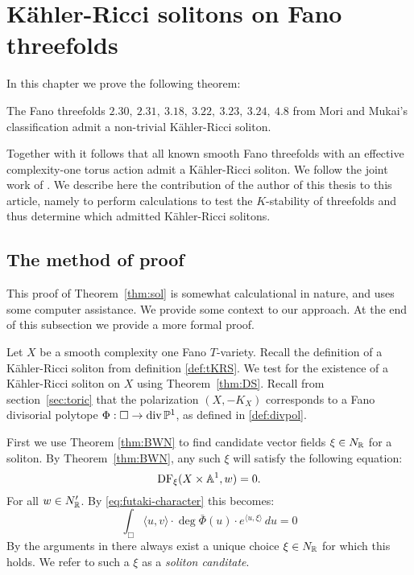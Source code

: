 \chapter{K\"ahler-Ricci solitons on Fano threefolds} \label{chap:sol}



In this chapter we prove the following theorem:
\begin{theorem} \label{thm:sol}
The Fano threefolds \(2.30, \ 2.31, \ 3.18, \ 3.22, \ 3.23, \ 3.24, \ 4.8\) from Mori and Mukai's classification \cite{mori1981classification} admit a non-trivial K\"ahler-Ricci soliton.
\end{theorem}
Together with \cite[Theorems. 6.1, 6.2]{ilten2015} it follows that all known smooth Fano threefolds with an effective complexity-one torus action admit a K\"ahler-Ricci soliton. We follow the joint work of \cite{cable2018classification}. We describe here the contribution of the author of this thesis to this article, namely to perform calculations to test the \(K\)-stability of threefolds and thus determine which admitted K\"ahler-Ricci solitons.

\section{The method of proof}
This proof of Theorem~\ref{thm:sol} is somewhat calculational in nature, and uses some computer assistance. We provide some context to our approach. At the end of this subsection we provide a more formal proof.

Let \(X\) be a smooth complexity one Fano \(T\)-variety. Recall the definition of a K\"ahler-Ricci soliton from definition \ref{def:tKRS}. We test for the existence of a K\"ahler-Ricci soliton on \(X\) using Theorem~\ref{thm:DS}. Recall from section~\ref{sec:toric} that the polarization \((X,-K_X)\) corresponds to a Fano divisorial polytope \(\Phi: \Box \to \operatorname{div} \mathbb{P}^1\), as defined in \ref{def:divpol}.

First we use Theorem \ref{thm:BWN} to find candidate vector fields \(\xi \in N_{\mathbb{R}}\) for a soliton. By Theorem~\ref{thm:BWN}, any such \(\xi\) will satisfy the following equation: 
\begin{equation} \label{eq:producteq}
\mathop{\rm DF}\nolimits_{\xi}(X \times \mathbb{A}^1, w) = 0.
\end{equation}
For all \(w \in N'_{\mathbb{R}}\). By \ref{eq:futaki-character} this becomes:
\begin{equation} \label{eq:combproducteq}
\int_{\Box} \langle u, v \rangle \cdot \deg \bar \Phi(u) \cdot e^{\langle u, \xi \rangle}\, du = 0
\end{equation}
By the arguments in \cite[Section~3.1]{donaldson2008kahler} there always exist a unique choice $\xi \in N_{\mathbb{R}}$ for which this holds. We refer to such a $\xi$ as a \textit{soliton canditate}.

